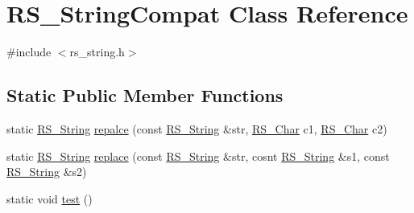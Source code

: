 \hypertarget{class_r_s___string_compat}{\section{R\-S\-\_\-\-String\-Compat Class Reference}
\label{class_r_s___string_compat}
}


{\ttfamily \#include $<$rs\-\_\-string.\-h$>$}

\subsection*{Static Public Member Functions}
\begin{DoxyCompactItemize}
\item 
static \hyperlink{rs__string_8h_a5adec11f318c2ae2ecdc6fe2b03be9fa}{R\-S\-\_\-\-String} \hyperlink{class_r_s___string_compat_a71a972ff0eb70a4847b5d0ebc6c9ec6e}{repalce} (const \hyperlink{rs__string_8h_a5adec11f318c2ae2ecdc6fe2b03be9fa}{R\-S\-\_\-\-String} \&str, \hyperlink{rs__string_8h_a79a21e7c7cf35afce06579328105a49e}{R\-S\-\_\-\-Char} c1, \hyperlink{rs__string_8h_a79a21e7c7cf35afce06579328105a49e}{R\-S\-\_\-\-Char} c2)
\item 
static \hyperlink{rs__string_8h_a5adec11f318c2ae2ecdc6fe2b03be9fa}{R\-S\-\_\-\-String} \hyperlink{class_r_s___string_compat_aeb157b3cda44e46b9ff373af52bdc593}{replace} (const \hyperlink{rs__string_8h_a5adec11f318c2ae2ecdc6fe2b03be9fa}{R\-S\-\_\-\-String} \&str, cosnt \hyperlink{rs__string_8h_a5adec11f318c2ae2ecdc6fe2b03be9fa}{R\-S\-\_\-\-String} \&s1, const \hyperlink{rs__string_8h_a5adec11f318c2ae2ecdc6fe2b03be9fa}{R\-S\-\_\-\-String} \&s2)
\item 
static void \hyperlink{class_r_s___string_compat_a7c1150996559363d4e345432005d0f0a}{test} ()
\end{DoxyCompactItemize}


